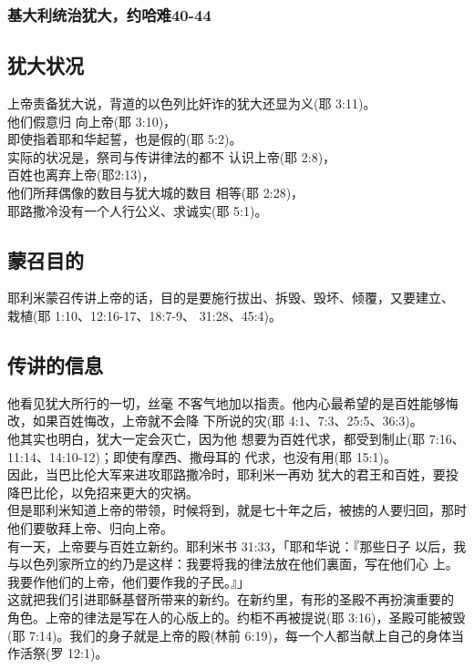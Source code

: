 \subsubsection{基大利统治犹大，约哈难40-44}

\subsection{犹大状况}
上帝责备犹大说，背道的以色列比奸诈的犹大还显为义(耶 3:11)。\\
他们假意归 向上帝(耶 3:10)，\\
即使指着耶和华起誓，也是假的(耶 5:2)。\\
实际的状况是，祭司与传讲律法的都不 认识上帝(耶 2:8)，\\
百姓也离弃上帝(耶2:13)，\\
他们所拜偶像的数目与犹大城的数目 相等(耶 2:28)，\\
耶路撒冷没有一个人行公义、求诚实(耶 5:1)。\\

\subsection{蒙召目的}
耶利米蒙召传讲上帝的话，目的是要施行拔出、拆毁、毁坏、倾覆，又要建立、 栽植(耶 1:10、12:16-17、18:7-9、 31:28、45:4)。

\subsection{传讲的信息}
他看见犹大所行的一切，丝毫 不客气地加以指责。他内心最希望的是百姓能够悔改，如果百姓悔改，上帝就不会降 下所说的灾(耶 4:1、7:3、25:5、36:3)。\\
他其实也明白，犹大一定会灭亡，因为他 想要为百姓代求，都受到制止(耶 7:16、11:14、14:10-12)；即使有摩西、撒母耳的 代求，也没有用(耶 15:1)。\\
因此，当巴比伦大军来进攻耶路撒冷时，耶利米一再劝 犹大的君王和百姓，要投降巴比伦，以免招来更大的灾祸。\\
但是耶利米知道上帝的带领，时候将到，就是七十年之后，被掳的人要归回，那时 他们要敬拜上帝、归向上帝。\\
有一天，上帝要与百姓立新约。耶利米书 31:33，「耶和华说：『那些日子 以后，我与以色列家所立的约乃是这样：我要将我的律法放在他们裏面，写在他们心 上。我要作他们的上帝，他们要作我的子民。』」\\
这就把我们引进耶稣基督所带来的新约。在新约里，有形的圣殿不再扮演重要的 角色。上帝的律法是写在人的心版上的。约柜不再被提说(耶 3:16)，圣殿可能被毁 (耶 7:14)。我们的身子就是上帝的殿(林前 6:19)，每一个人都当献上自己的身体当 作活祭(罗 12:1)。\\


